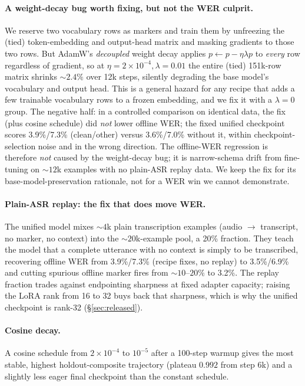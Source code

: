 \documentclass[11pt]{article}
\begin{document}
\paragraph{A weight-decay bug worth fixing, but not the WER culprit.} We reserve two vocabulary rows as markers and train them by unfreezing the (tied) token-embedding and output-head matrix and masking gradients to those two rows. But AdamW's \emph{decoupled} weight decay applies $p \leftarrow p - \eta\lambda p$ to \emph{every} row regardless of gradient, so at $\eta{=}2\!\times\!10^{-4},\lambda{=}0.01$ the entire (tied) 151k-row matrix shrinks ${\sim}2.4\%$ over 12k steps, silently degrading the base model's vocabulary and output head. This is a general hazard for any recipe that adds a few trainable vocabulary rows to a frozen embedding, and we fix it with a $\lambda{=}0$ group. The negative half: in a controlled comparison on identical data, the fix (plus cosine schedule) did \emph{not} lower offline WER; the fixed unified checkpoint scores 3.9\%/7.3\% (clean/other) versus 3.6\%/7.0\% without it, within checkpoint-selection noise and in the wrong direction. The offline-WER regression is therefore \emph{not} caused by the weight-decay bug; it is narrow-schema drift from fine-tuning on ${\sim}12$k examples with no plain-ASR replay data. We keep the fix for its base-model-preservation rationale, not for a WER win we cannot demonstrate.

\paragraph{Plain-ASR replay: the fix that does move WER.} The unified model mixes ${\sim}4$k plain transcription examples (audio $\to$ transcript, no marker, no context) into the ${\sim}20$k-example pool, a 20\% fraction. They teach the model that a complete utterance with no context is simply to be transcribed, recovering offline WER from 3.9\%/7.3\% (recipe fixes, no replay) to 3.5\%/6.9\% and cutting spurious offline marker fires from ${\sim}10$--$20\%$ to 3.2\%. The replay fraction trades against endpointing sharpness at fixed adapter capacity; raising the LoRA rank from 16 to 32 buys back that sharpness, which is why the unified checkpoint is rank-32 (\S\ref{sec:released}).

\paragraph{Cosine decay.} A cosine schedule from $2\!\times\!10^{-4}$ to $10^{-5}$ after a 100-step warmup gives the most stable, highest holdout-composite trajectory (plateau $0.992$ from step 6k) and a slightly less eager final checkpoint than the constant schedule.
\end{document}
